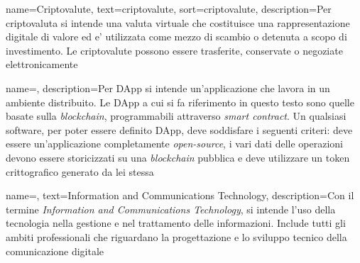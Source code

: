 
\renewcommand{\acronymname}{Acronimi e Abbreviazioni}

    



\renewcommand{\glossaryname}{Glossario}

{
    name={Criptovalute},
    text={criptovalute},
    sort={criptovalute},
    description={Per criptovaluta si intende una valuta virtuale che costituisce una rappresentazione digitale di valore ed e' utilizzata come mezzo di scambio o detenuta a scopo di investimento. Le criptovalute possono essere trasferite, conservate o negoziate elettronicamente}
}

{
    name={},
    description={Per DApp si intende un'applicazione che lavora in un ambiente distribuito. Le DApp a cui si fa riferimento in questo testo sono quelle basate sulla \textit{blockchain}, programmabili attraverso \textit{smart contract}. Un qualsiasi software, per poter essere definito DApp, deve soddisfare i seguenti criteri: deve essere un'applicazione completamente \textit{open-source}, i vari dati delle operazioni devono essere storicizzati su una \textit{blockchain} pubblica e deve utilizzare un token crittografico generato da lei stessa}
}

{
    name=,
    text=Information and Communications Technology,
    description={Con il termine \textit{Information and Communications Technology}, si intende l'uso della tecnologia nella gestione e nel trattamento delle informazioni. Include tutti gli ambiti professionali che riguardano la progettazione e lo sviluppo tecnico della comunicazione digitale}
}

